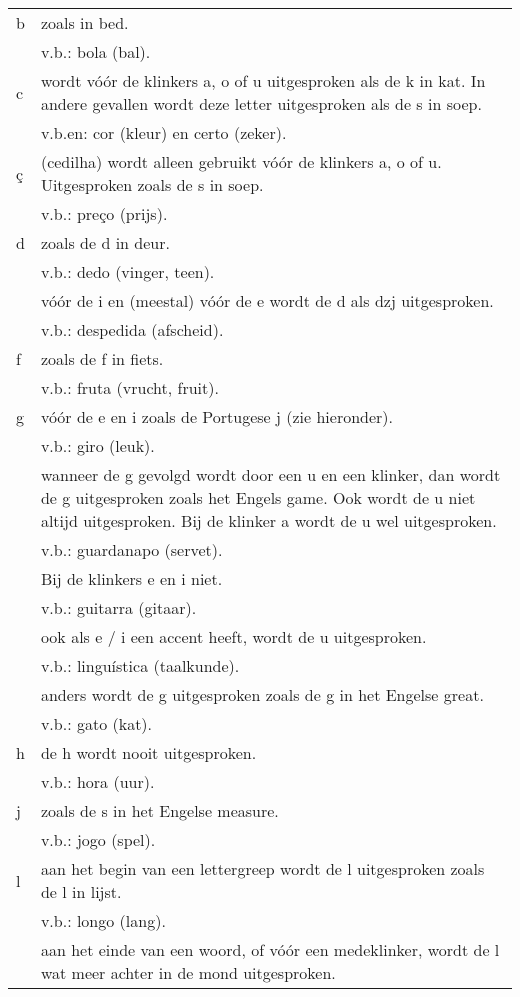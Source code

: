 \begin{longtable}{p{} p{}}
b & zoals in bed.\\
 & v.b.: bola (bal).\\
c & wordt vóór de klinkers a, o of u uitgesproken als de k in kat. In andere gevallen wordt deze letter uitgesproken als de s in soep.\\
 & v.b.en: cor (kleur) en certo (zeker).\\
ç & (cedilha) wordt alleen gebruikt vóór de klinkers a, o of u. Uitgesproken zoals de s in soep.\\
 & v.b.: preço (prijs).\\
d & zoals de d in deur.\\
 & v.b.: dedo (vinger, teen).\\
& vóór de i en (meestal) vóór de e wordt de d als dzj uitgesproken.\\
 & v.b.: despedida (afscheid).\\
f & zoals de f in fiets.\\
 & v.b.: fruta (vrucht, fruit).\\
g & vóór de e en i zoals de Portugese j (zie hieronder).\\
 & v.b.: giro (leuk).\\
& wanneer de g gevolgd wordt door een u en een klinker, dan wordt de g uitgesproken zoals het Engels game. Ook wordt de u niet altijd uitgesproken. Bij de klinker a wordt de u wel uitgesproken.\\
 & v.b.: guardanapo (servet).\\
& Bij de klinkers e en i niet.\\
 & v.b.: guitarra (gitaar).\\
& ook als e / i een accent heeft, wordt de u uitgesproken.\\
 & v.b.: linguística (taalkunde).\\
& anders wordt de g uitgesproken zoals de g in het Engelse great.\\
 & v.b.: gato (kat).\\
h & de h wordt nooit uitgesproken.\\
 & v.b.: hora (uur).\\
j & zoals de s in het Engelse measure.\\
 & v.b.: jogo (spel).\\
l & aan het begin van een lettergreep wordt de l uitgesproken zoals de l in lijst.\\
 & v.b.: longo (lang).\\
& aan het einde van een woord, of vóór een medeklinker, wordt de l wat meer achter in de mond uitgesproken.\\

\end{longtable}
